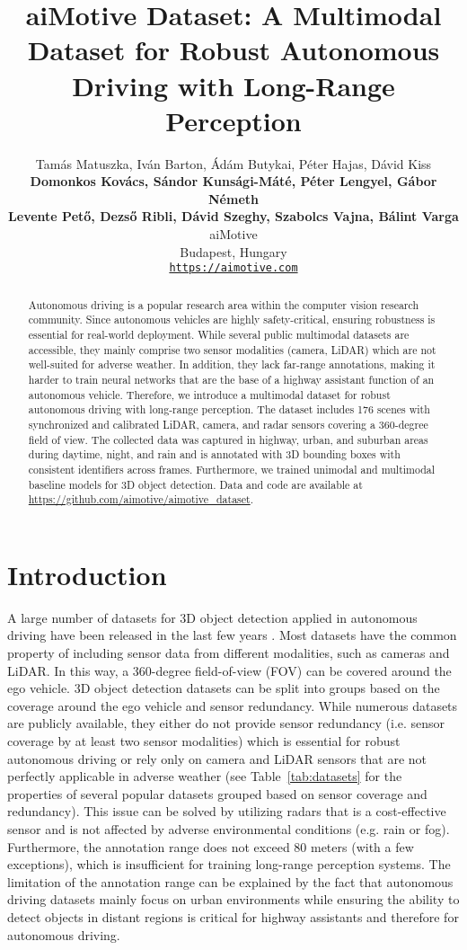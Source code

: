 \documentclass{article}
\title{aiMotive Dataset: A Multimodal Dataset for Robust Autonomous Driving with Long-Range Perception}
\author{
    Tam\'{a}s Matuszka, Iv\'{a}n Barton, Ádám Butykai, P\'{e}ter Hajas, Dávid Kiss \\
    \textbf{Domonkos Kovács, S\'{a}ndor Kuns\'{a}gi-M\'{a}té, Péter Lengyel, G\'{a}bor N\'{e}meth} \\
    \textbf{Levente Pető, Dezső Ribli, D\'{a}vid Szeghy, Szabolcs Vajna, B\'{a}lint Varga} \\
    aiMotive \\
    Budapest, Hungary \\
    \texttt{\url{https://aimotive.com}} \\
}
\begin{document}
\maketitle

\begin{abstract}
  Autonomous driving is a popular research area within the computer vision research community. Since autonomous vehicles are highly safety-critical, ensuring robustness is essential for real-world deployment. While several public multimodal datasets are accessible, they mainly comprise two sensor modalities (camera, LiDAR) which are not well-suited for adverse weather. In addition, they lack far-range annotations, making it harder to train neural networks that are the base of a highway assistant function of an autonomous vehicle. Therefore, we introduce a multimodal dataset for robust autonomous driving with long-range perception. The dataset includes 176 scenes with synchronized and calibrated LiDAR, camera, and radar sensors covering a 360-degree field of view. The collected data was captured in highway, urban, and suburban areas during daytime, night, and rain and is annotated with 3D bounding boxes with consistent identifiers across frames. Furthermore, we trained unimodal and multimodal baseline models for 3D object detection. Data and code are available at \url{https://github.com/aimotive/aimotive_dataset}.
\end{abstract}

\section{Introduction}
\label{intro}

A large number of datasets for 3D object detection applied in autonomous driving have been released in the last few years \citep{kitti, argo, huang2018apolloscape, pham20203d, patil2019h3d, nuscenes}. Most datasets have the common property of including sensor data from different modalities, such as cameras and LiDAR. In this way, a 360-degree field-of-view (FOV) can be covered around the ego vehicle. 3D object detection datasets can be split into groups based on the coverage around the ego vehicle and sensor redundancy. While numerous datasets are publicly available, they either do not provide sensor redundancy (i.e. sensor coverage by at least two sensor modalities) which is essential for robust autonomous driving or rely only on camera and LiDAR sensors that are not perfectly applicable in adverse weather (see Table~\ref{tab:datasets} for the properties of several popular datasets grouped based on sensor coverage and redundancy). This issue can be solved by utilizing radars that is a cost-effective sensor and is not affected by adverse environmental conditions (e.g. rain or fog). Furthermore, the annotation range does not exceed 80 meters (with a few exceptions), which is insufficient for training long-range perception systems. The limitation of the annotation range can be explained by the fact that autonomous driving datasets mainly focus on urban environments while ensuring the ability to detect objects in distant regions is critical for highway assistants and therefore for autonomous driving.
\end{document}
